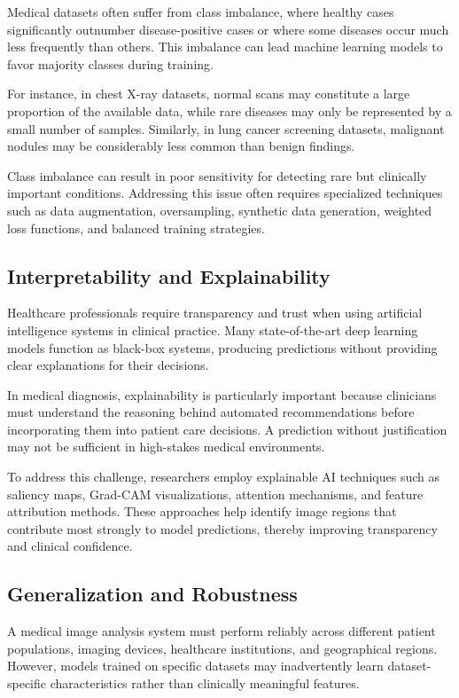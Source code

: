 Medical datasets often suffer from class imbalance, where healthy cases significantly outnumber disease-positive cases or where some diseases occur much less frequently than others. This imbalance can lead machine learning models to favor majority classes during training.

For instance, in chest X-ray datasets, normal scans may constitute a large proportion of the available data, while rare diseases may only be represented by a small number of samples. Similarly, in lung cancer screening datasets, malignant nodules may be considerably less common than benign findings.

Class imbalance can result in poor sensitivity for detecting rare but clinically important conditions. Addressing this issue often requires specialized techniques such as data augmentation, oversampling, synthetic data generation, weighted loss functions, and balanced training strategies.

\subsection{Interpretability and Explainability}

Healthcare professionals require transparency and trust when using artificial intelligence systems in clinical practice. Many state-of-the-art deep learning models function as black-box systems, producing predictions without providing clear explanations for their decisions.

In medical diagnosis, explainability is particularly important because clinicians must understand the reasoning behind automated recommendations before incorporating them into patient care decisions. A prediction without justification may not be sufficient in high-stakes medical environments.

To address this challenge, researchers employ explainable AI techniques such as saliency maps, Grad-CAM visualizations, attention mechanisms, and feature attribution methods. These approaches help identify image regions that contribute most strongly to model predictions, thereby improving transparency and clinical confidence.

\subsection{Generalization and Robustness}

A medical image analysis system must perform reliably across different patient populations, imaging devices, healthcare institutions, and geographical regions. However, models trained on specific datasets may inadvertently learn dataset-specific characteristics rather than clinically meaningful features.

